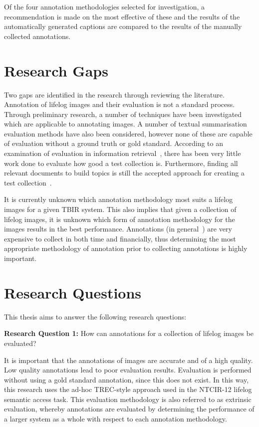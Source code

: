 Of the four annotation methodologies selected for investigation, a recommendation is made on the most effective of these and the results of the automatically generated captions are compared to the results of the manually collected annotations. 

\section{Research Gaps}

Two gaps are identified in the research through reviewing the literature. Annotation of lifelog images and their evaluation is not a standard process. Through preliminary research, a number of techniques have been investigated which are applicable to annotating images. A number of textual summarisation evaluation methods have also been considered, however none of these are capable of evaluation without a ground truth or gold standard. According to an examination of evaluation in information retrieval~\cite[p. 24]{sanderson2010test}, there has been very little work done to evaluate how good a test collection is. Furthermore, finding all relevant documents to build topics is still the accepted approach for creating a test collection~\cite{cooper1973selecting}.

It is currently unknown which annotation methodology most suits a lifelog images for a given TBIR system. This also implies that given a collection of lifelog images, it is unknown which form of annotation methodology for the images results in the best performance. Annotations (in general~\cite{snow2008cheap}) are very expensive to collect in both time and financially, thus determining the most appropriate methodology of annotation prior to collecting annotations is highly important.

\section{Research Questions}

This thesis aims to answer the following research questions:

\textbf{Research Question 1:} How can annotations for a collection of lifelog images be evaluated?

It is important that the annotations of images are accurate and of a high quality. Low quality annotations lead to poor evaluation results. Evaluation is performed without using a gold standard annotation, since this does not exist. In this way, this research uses the ad-hoc TREC-style approach used in the NTCIR-12 lifelog semantic access task. This evaluation methodology is also referred to as extrinsic evaluation, whereby annotations are evaluated by determining the performance of a larger system as a whole with respect to each annotation methodology.

